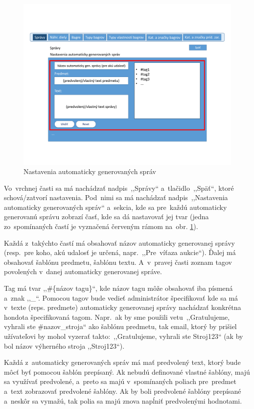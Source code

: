 \begin{figure}[H]\centering
\includegraphics[width=140mm]{../img/UI concept/messages settings}
\caption{Nastavenia automaticky generovaných správ}
\label{messages settings}
\end{figure}

Vo~vrchnej časti sa má nachádzať nadpis~,,Správy`` a~tlačidlo~,,Späť``, ktoré schová/zatvorí nastavenia. Pod~nimi sa má nachádzať nadpis~,,Nastavenia automaticky generovaných správ`` a~sekcia, kde sa pre~každú automaticky generovanú správu zobrazí časť, kde sa dá nastavovať jej tvar (jedna zo~spomínaných častí je vyznačená červeným rámom na~obr. \ref{messages settings}).

Každá z~takýchto častí má obsahovať názov automaticky generovanej správy (resp.~pre koho, akú udalosť je určená, napr.~,,Pre~víťaza aukcie``). Ďalej má obsahovať šablónu predmetu, šablónu textu. A~v~pravej časti zoznam tagov povolených v~danej automaticky generovanej správe.

Tag má tvar ,,\#\{názov tagu\}``, kde názov tagu môže obsahovať iba písmená a~znak ,,\_``. Pomocou tagov bude vedieť administrátor špecifikovať kde sa má v~texte (reps. predmete) automaticky generovanej správy nachádzať konkrétna hondota špecifikovaná tagom. Napr.~ak by sme použili vetu~,,Gratulujeme, vyhrali ste \#nazov\_stroja`` ako šablónu predmetu, tak email, ktorý by prišiel užívateľovi by mohol vyzerať takto:~,,Gratulujeme, vyhrali ste Stroj123`` (ak by bol názov výherného stroja ,,Stroj123``).

Každá z~automaticky generovaných správ má mať predvolený text, ktorý bude môcť byť pomocou šablón prepísaný. Ak nebudú definované vlastné šablóny, majú sa využívať predvolené, a~preto sa majú v~spomínaných poliach pre~predmet a~text zobrazovať predvolené šablóny. Ak by boli predvolené šablóny prepísané a~neskôr sa vymažú, tak polia sa majú znova napĺniť predvolenými hodnotami.


